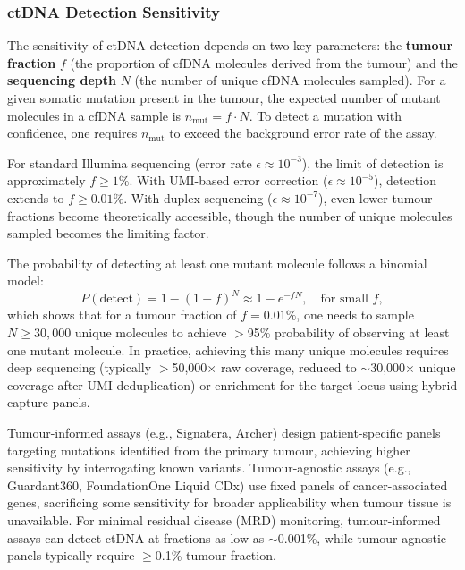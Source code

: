 \subsubsection{ctDNA Detection Sensitivity}

The sensitivity of ctDNA detection depends on two key parameters: the \textbf{tumour fraction} $f$ (the proportion of cfDNA molecules derived from the tumour) and the \textbf{sequencing depth} $N$ (the number of unique cfDNA molecules sampled). For a given somatic mutation present in the tumour, the expected number of mutant molecules in a cfDNA sample is $n_{\text{mut}} = f \cdot N$. To detect a mutation with confidence, one requires $n_{\text{mut}}$ to exceed the background error rate of the assay.

For standard Illumina sequencing (error rate $\epsilon \approx 10^{-3}$), the limit of detection is approximately $f \geq 1\%$. With UMI-based error correction ($\epsilon \approx 10^{-5}$), detection extends to $f \geq 0.01\%$. With duplex sequencing ($\epsilon \approx 10^{-7}$), even lower tumour fractions become theoretically accessible, though the number of unique molecules sampled becomes the limiting factor.

The probability of detecting at least one mutant molecule follows a binomial model:
\begin{equation}
  P(\text{detect}) = 1 - (1 - f)^{N} \approx 1 - e^{-fN}, \quad \text{for small } f,
  \label{eq:specialized:ctdna-sensitivity}
\end{equation}
which shows that for a tumour fraction of $f = 0.01\%$, one needs to sample $N \geq 30{,}000$ unique molecules to achieve $>$95\% probability of observing at least one mutant molecule. In practice, achieving this many unique molecules requires deep sequencing (typically $>$50{,}000$\times$ raw coverage, reduced to $\sim$30{,}000$\times$ unique coverage after UMI deduplication) or enrichment for the target locus using hybrid capture panels.

\begin{tipbox}[title={Tumour-Informed vs.\ Tumour-Agnostic Assays}]
Tumour-informed assays (e.g., Signatera, Archer) design patient-specific panels targeting mutations identified from the primary tumour, achieving higher sensitivity by interrogating known variants. Tumour-agnostic assays (e.g., Guardant360, FoundationOne Liquid CDx) use fixed panels of cancer-associated genes, sacrificing some sensitivity for broader applicability when tumour tissue is unavailable. For minimal residual disease (MRD) monitoring, tumour-informed assays can detect ctDNA at fractions as low as $\sim$0.001\%, while tumour-agnostic panels typically require $\geq$0.1\% tumour fraction.
\end{tipbox}

